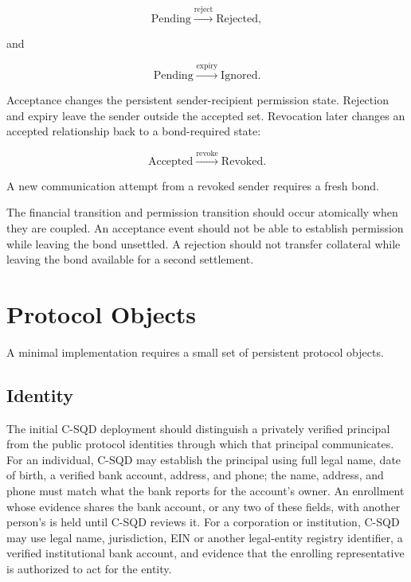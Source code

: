\documentclass[11pt]{article}
\begin{document}
\begin{equation}
\text{Pending}
\xrightarrow{\text{reject}}
\text{Rejected},
\end{equation}

and

\begin{equation}
\text{Pending}
\xrightarrow{\text{expiry}}
\text{Ignored}.
\end{equation}

Acceptance changes the persistent sender-recipient permission state. Rejection and expiry leave the sender outside the accepted set. Revocation later changes an accepted relationship back to a bond-required state:

\begin{equation}
\text{Accepted}
\xrightarrow{\text{revoke}}
\text{Revoked}.
\end{equation}

A new communication attempt from a revoked sender requires a fresh bond.

The financial transition and permission transition should occur atomically when they are coupled. An acceptance event should not be able to establish permission while leaving the bond unsettled. A rejection should not transfer collateral while leaving the bond available for a second settlement.

\section{Protocol Objects}

A minimal implementation requires a small set of persistent protocol objects.

\subsection{Identity}

The initial C-SQD deployment should distinguish a privately verified principal from the public protocol identities through which that principal communicates. For an individual, C-SQD may establish the principal using full legal name, date of birth, a verified bank account, address, and phone; the name, address, and phone must match what the bank reports for the account's owner. An enrollment whose evidence shares the bank account, or any two of these fields, with another person's is held until C-SQD reviews it. For a corporation or institution, C-SQD may use legal name, jurisdiction, EIN or another legal-entity registry identifier, a verified institutional bank account, and evidence that the enrolling representative is authorized to act for the entity.
\end{document}
